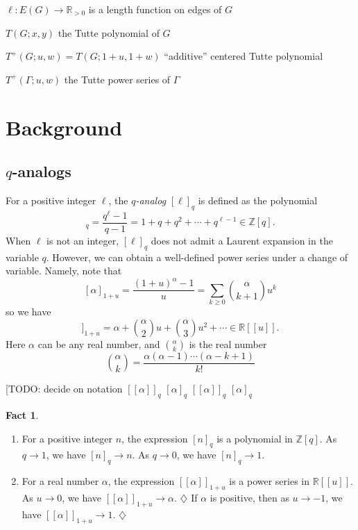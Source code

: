 \documentclass{amsart}
\theoremstyle{definition}
\newtheorem{fact}[thm]{Fact}
\newcommand{\RR}{\mathbb{R}}
\newcommand{\ZZ}{\mathbb{Z}}
\newcommand{\RRpos}{\RR_{>0}}
\newcommand{\fanalog}[2]{[\![#2]\!]_{#1}}
\newcommand{\analog}[2]{[#2]_{#1}}
\newcommand{\harry}[1]{{\color{red} \sf $\diamondsuit$  {#1} $\diamondsuit$ }}
\newcommand{\note}[1]{\harry{#1}}
\begin{document}
$\ell : E(G) \to \RRpos$
is a length function on edges of $G$

$T(G; x,y)$ the Tutte polynomial of $G$

$T^+(G; u,w) = T(G; 1+u,1+w)$ ``additive'' centered Tutte polynomial

$T^+(\Gamma; u,w)$ the Tutte power series of $\Gamma$




\section{Background}

\subsection{$q$-analogs}
For a positive integer $\ell$,
the {\em $q$-analog}
$[\ell]_q$ is defined as
the polynomial
\begin{equation*}
[\ell]_q = \frac{q^\ell - 1}{q - 1}
= 1 + q + q^2 + \cdots + q^{\ell -1} 
\in \ZZ[q].
\end{equation*}
When $\ell$ is not an integer, 
$[\ell]_q$ does not admit a Laurent expansion in the variable $q$.
However, we can obtain a well-defined power series under a change of variable.
Namely, note that
\[ [\alpha]_{1+u} = \frac{(1+u)^\alpha - 1}{u}
= \sum_{k \geq 0} \binom{\alpha}{k+1}u^{k} 
\]
so we have 
\begin{equation}
\fanalog{1+u}{\alpha} = \alpha + \binom{\alpha}{2} u + \binom{\alpha}{3} u^2 + \cdots
\in \RR[[u]] .
\end{equation}
Here $\alpha$ can be any real number, and $\binom{\alpha}{k}$ is the real number
\begin{equation}
\binom{\alpha}{k} = \frac{\alpha (\alpha-1) \cdots (\alpha-k+1)}{k!} 
\end{equation}

[TODO: decide on notation
$\fanalog{q}{\alpha}$
$\analog{q}{\alpha}$
$[\![\alpha]\!]_q$
$\left[\alpha\right]_q$

\begin{fact}
\hfill
\begin{enumerate}
\item 
For a positive integer $n$, the expression $\analog{q}{n}$ is a polynomial in $\ZZ[q]$. 
As $q \to 1$, we have $\analog{q}{n} \to n$.
As $q \to 0$, we have $\analog{q}{n} \to 1$.

\item 
For a real number $\alpha$, the expression $\fanalog{1 + u}{\alpha}$ is a power series in $\RR[[u]]$.
As $u \to 0$, we have $\fanalog{1 + u}{\alpha} \to \alpha$.
\note{If $\alpha$ is positive, then as $u \to -1$, we have $\fanalog{1 + u}{\alpha} \to 1$.}
\end{enumerate}
\end{fact}
\end{document}
